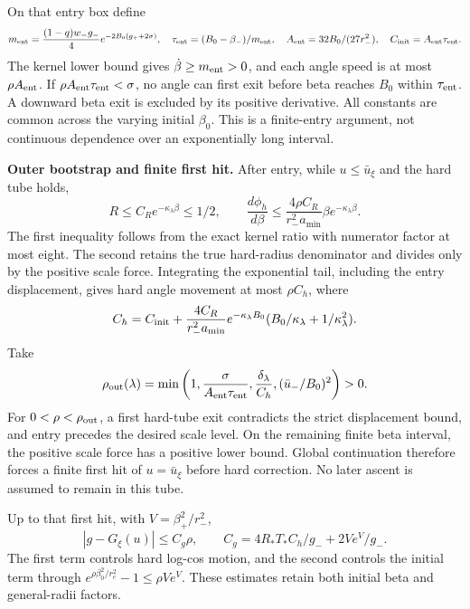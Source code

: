 \documentclass[11pt,a4paper]{article}
\begin{document}
On that entry box define
\[
 m_{\rm ent}=\frac{(1-q)w_-g_-}{4}e^{-2B_0(g_++2\sigma)},\quad
 \tau_{\rm ent}=(B_0-\beta_-)/m_{\rm ent},\quad
 A_{\rm ent}=32B_0/(27r_-^2),\quad C_{\rm init}=A_{\rm ent}\tau_{\rm ent}.
\]
The kernel lower bound gives $\dot\beta\ge m_{\rm ent}>0$, and each angle speed is at most $\rho A_{\rm ent}$. If $\rho A_{\rm ent}\tau_{\rm ent}<\sigma$, no angle can first exit before beta reaches $B_0$ within $\tau_{\rm ent}$. A downward beta exit is excluded by its positive derivative. All constants are common across the varying initial $\beta_0$. This is a finite-entry argument, not continuous dependence over an exponentially long interval.

\textbf{Outer bootstrap and finite first hit.} After entry, while $u\le\bar u_\xi$ and the hard tube holds,
\[
 R\le C_R e^{-\kappa_\lambda\beta}\le1/2,\qquad
 \frac{d\phi_h}{d\beta}\le
 \frac{4\rho C_R}{r_-^2a_{\min}}\beta e^{-\kappa_\lambda\beta}.
\]
The first inequality follows from the exact kernel ratio with numerator factor at most eight. The second retains the true hard-radius denominator and divides only by the positive scale force. Integrating the exponential tail, including the entry displacement, gives hard angle movement at most $\rho C_h$, where
\[
 C_h=C_{\rm init}+\frac{4C_R}{r_-^2a_{\min}}
 e^{-\kappa_\lambda B_0}(B_0/\kappa_\lambda+1/\kappa_\lambda^2).
\]
Take
\[
 \rho_{\rm out}(\lambda)=\min\left(1,
 \frac{\sigma}{A_{\rm ent}\tau_{\rm ent}},
 \frac{\delta_\lambda}{C_h},(\bar u_-/B_0)^2\right)>0 .
\]
For $0<\rho<\rho_{\rm out}$, a first hard-tube exit contradicts the strict displacement bound, and entry precedes the desired scale level. On the remaining finite beta interval, the positive scale force has a positive lower bound. Global continuation therefore forces a finite first hit of $u=\bar u_\xi$ before hard correction. No later ascent is assumed to remain in this tube.

Up to that first hit, with $V=\beta_+^2/r_-^2$,
\[
 |g-G_\xi(u)|\le C_g\rho,\qquad
 C_g=4R_*T_*C_h/g_-+2Ve^V/g_- .
\]
The first term controls hard log-cos motion, and the second controls the initial term through $e^{\rho\beta_0^2/r_e^2}-1\le\rho Ve^V$. These estimates retain both initial beta and general-radii factors.
\end{document}
